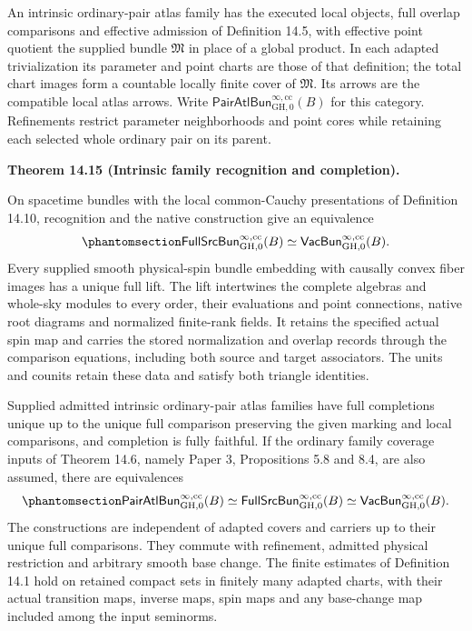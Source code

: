 \documentclass[
  english,
  11pt,
  reqno]{amsart}
\makeatletter
\newcommand{\pandocstatementheading}[1]{%
  \par\if@nobreak\else
    \addpenalty{\@beginparpenalty}%
    \addvspace{.5\baselineskip plus .2\baselineskip minus .2\baselineskip}%
  \fi
  {\normalfont\bfseries #1\par}%
  \nobreak\@afterindenttrue\@afterheading
}
\makeatother
\begin{document}
An intrinsic ordinary-pair atlas family has the executed local objects,
full overlap comparisons and effective admission of Definition 14.5,
with effective point quotient the supplied bundle \(\mathfrak M\) in
place of a global product. In each adapted trivialization its parameter
and point charts are those of that definition; the total chart images
form a countable locally finite cover of \(\mathfrak M\). Its arrows are
the compatible local atlas arrows. Write
\(\mathsf{PairAtlBun}^{\infty,\mathrm{cc}}_{\mathrm{GH},0}(B)\) for this
category. Refinements restrict parameter neighborhoods and point cores
while retaining each selected whole ordinary pair on its parent.

\pandocstatementheading{\protect{}\label{thm:intrinsic-full-family-correspondence}Theorem 14.15 (Intrinsic family recognition and completion).}

On spacetime bundles with the local common-Cauchy presentations of
Definition 14.10, recognition and the native construction give an
equivalence
\begin{equation}\protect\phantomsection\label{eq:intrinsic-full-family-equivalence}{
\mathsf{FullSrcBun}^{\infty,\mathrm{cc}}_{\mathrm{GH},0}(B)
\simeq
\mathsf{VacBun}^{\infty,\mathrm{cc}}_{\mathrm{GH},0}(B).
}\end{equation} Every supplied smooth physical-spin bundle embedding
with causally convex fiber images has a unique full lift. The lift
intertwines the complete algebras and whole-sky modules to every order,
their evaluations and point connections, native root diagrams and
normalized finite-rank fields. It retains the specified actual spin map
and carries the stored normalization and overlap records through the
comparison equations, including both source and target associators. The
units and counits retain these data and satisfy both triangle
identities.

Supplied admitted intrinsic ordinary-pair atlas families have full
completions unique up to the unique full comparison preserving the given
marking and local comparisons, and completion is fully faithful. If the
ordinary family coverage inputs of Theorem 14.6, namely Paper 3,
Propositions 5.8 and 8.4, are also assumed, there are equivalences
\begin{equation}\protect\phantomsection\label{eq:intrinsic-family-three-correspondences}{
\mathsf{PairAtlBun}^{\infty,\mathrm{cc}}_{\mathrm{GH},0}(B)
\simeq
\mathsf{FullSrcBun}^{\infty,\mathrm{cc}}_{\mathrm{GH},0}(B)
\simeq
\mathsf{VacBun}^{\infty,\mathrm{cc}}_{\mathrm{GH},0}(B).
}\end{equation} The constructions are independent of adapted covers and
carriers up to their unique full comparisons. They commute with
refinement, admitted physical restriction and arbitrary smooth base
change. The finite estimates of Definition 14.1 hold on retained compact
sets in finitely many adapted charts, with their actual transition maps,
inverse maps, spin maps and any base-change map included among the input
seminorms.
\end{document}
